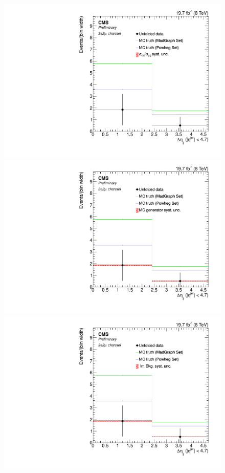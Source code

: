 \begin{figure}[hbtp]
 \begin{center}
   \includegraphics[width=0.8\cmsFigWidth]{Figures/Unfolding/Systematics/ZZTo2e2m_Deta_qqgg_Mad_fr}     
   \includegraphics[width=0.8\cmsFigWidth]{Figures/Unfolding/Systematics/ZZTo2e2m_Deta_MCgen_Mad_fr}     
   \includegraphics[width=0.8\cmsFigWidth]{Figures/Unfolding/Systematics/ZZTo2e2m_Deta_IrrBkg_Mad_fr}

\end{center}
\end{figure}

